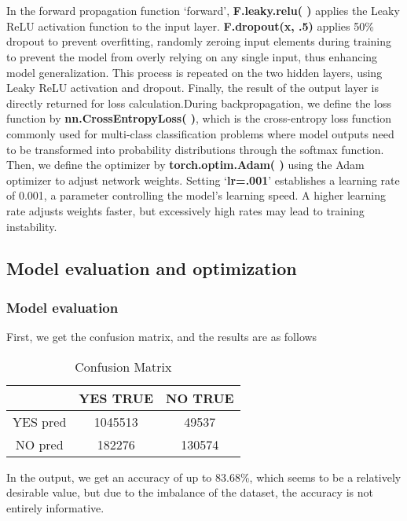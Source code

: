 \documentclass[10pt]{article}
\begin{document}
\\\\
In the forward propagation function ‘forward’,\textbf{ F.leaky.relu( ) }applies the Leaky ReLU activation function to the input layer. \textbf{F.dropout(x, .5)} applies 50\% dropout to prevent overfitting, randomly zeroing input elements during training to prevent the model from overly relying on any single input, thus enhancing model generalization. This process is repeated on the two hidden layers, using Leaky ReLU activation and dropout. Finally, the result of the output layer is directly returned for loss calculation.During backpropagation, we define the loss function by \textbf{nn.CrossEntropyLoss( )}, which is the cross-entropy loss function commonly used for multi-class classification problems where model outputs need to be transformed into probability distributions through the softmax function. Then, we define the optimizer by \textbf{torch.optim.Adam( )} using the Adam optimizer to adjust network weights. Setting ‘\textbf{lr=.001}’ establishes a learning rate of 0.001, a parameter controlling the model's learning speed. A higher learning rate adjusts weights faster, but excessively high rates may lead to training instability.

\subsection{Model evaluation and optimization}
\subsubsection{Model evaluation}
First, we get the confusion matrix, and the results are as follows 

\begin{table}[H]
    \centering
  
    \begin{tabular}{|c|c|c|} \hline 
         & YES TRUE & NO TRUE\\ \hline 
        YES pred & 1045513 & 49537\\ \hline 
        NO pred & 182276 & 130574\\ \hline
    \end{tabular}
       \caption{Confusion Matrix}
       \label{confusion-lucia}
   
\end{table}
In the output, we get an accuracy of up to 83.68\%, which seems to be a relatively desirable value, but due to the imbalance of the dataset, the accuracy is not entirely informative. 
\end{document}
